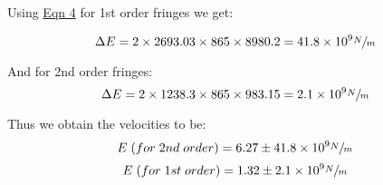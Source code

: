 	\vspace{-5mm}
	Using \hyperref[eqn:4]{Eqn 4} for 1st order fringes we get:
	
	\vspace{-5mm}
	$$
	\Delta E
	     = 2 \times 2693.03 \times 865 \times 8980.2
		 = 41.8\times 10^9 \sfrac{N}{m}
	$$

	And for 2nd order fringes:
	$$
	\Delta E
	     = 2 \times 1238.3 \times 865 \times 983.15
		 = 2.1 \times 10^9 \sfrac{N}{m}
	$$

	Thus we obtain the velocities to be:
	$$E\;(for\;2nd\;order) = 6.27 \pm 41.8\times 10^9 \sfrac{N}{m}$$
	$$E\;(for\;1st\;order) = 1.32 \pm 2.1\times 10^9 \sfrac{N}{m}$$
